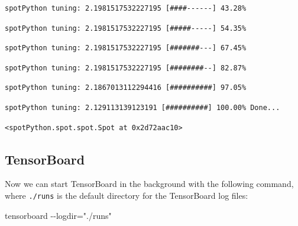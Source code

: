 \documentclass[
  letterpaper,
  DIV=11,
  numbers=noendperiod]{scrreprt}
\newenvironment{Shaded}{\begin{snugshade}}{\end{snugshade}}
\newcommand{\NormalTok}[1]{\textcolor[rgb]{0.00,0.23,0.31}{#1}}
\begin{document}
\begin{verbatim}
spotPython tuning: 2.1981517532227195 [####------] 43.28% 
\end{verbatim}

\begin{verbatim}
spotPython tuning: 2.1981517532227195 [#####-----] 54.35% 
\end{verbatim}

\begin{verbatim}
spotPython tuning: 2.1981517532227195 [#######---] 67.45% 
\end{verbatim}

\begin{verbatim}
spotPython tuning: 2.1981517532227195 [########--] 82.87% 
\end{verbatim}

\begin{verbatim}
spotPython tuning: 2.1867013112294416 [##########] 97.05% 
\end{verbatim}

\begin{verbatim}
spotPython tuning: 2.129113139123191 [##########] 100.00% Done...
\end{verbatim}

\begin{verbatim}
<spotPython.spot.spot.Spot at 0x2d72aac10>
\end{verbatim}

\hypertarget{sec-tensorboard-10}{%
\subsection{TensorBoard}\label{sec-tensorboard-10}}

Now we can start TensorBoard in the background with the following
command, where \texttt{./runs} is the default directory for the
TensorBoard log files:

\begin{Shaded}
\begin{Highlighting}[]
\NormalTok{tensorboard {-}{-}logdir="./runs"}
\end{Highlighting}
\end{Shaded}
\end{document}
